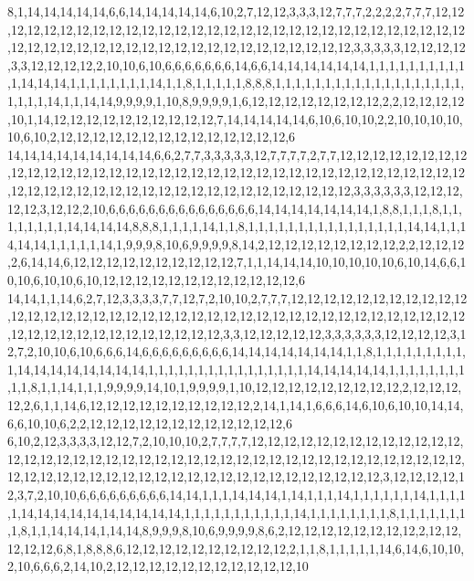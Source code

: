 8,1,14,14,14,14,14,6,6,14,14,14,14,14,6,10,2,7,12,12,3,3,3,12,7,7,7,2,2,2,2,7,7,7,12,12,12,12,12,12,12,12,12,12,12,12,12,12,12,12,12,12,12,12,12,12,12,12,12,12,12,12,12,12,12,12,12,12,12,12,12,12,12,12,12,12,12,12,12,12,12,12,12,12,12,3,3,3,3,3,12,12,12,12,3,3,12,12,12,12,2,10,10,6,10,6,6,6,6,6,6,6,14,6,6,14,14,14,14,14,14,1,1,1,1,1,1,1,1,1,1,1,14,14,14,1,1,1,1,1,1,1,1,14,1,1,8,1,1,1,1,1,8,8,8,1,1,1,1,1,1,1,1,1,1,1,1,1,1,1,1,1,1,1,1,1,1,1,14,1,1,14,14,9,9,9,9,1,10,8,9,9,9,9,1,6,12,12,12,12,12,12,12,12,2,2,12,12,12,12,10,1,14,12,12,12,12,12,12,12,12,12,12,7,14,14,14,14,14,6,10,6,10,10,2,2,10,10,10,10,10,6,10,2,12,12,12,12,12,12,12,12,12,12,12,12,12,12,6
14,14,14,14,14,14,14,14,14,6,6,2,7,7,3,3,3,3,3,12,7,7,7,7,2,7,7,12,12,12,12,12,12,12,12,12,12,12,12,12,12,12,12,12,12,12,12,12,12,12,12,12,12,12,12,12,12,12,12,12,12,12,12,12,12,12,12,12,12,12,12,12,12,12,12,12,12,12,12,12,12,12,12,12,3,3,3,3,3,3,12,12,12,12,12,3,12,12,2,10,6,6,6,6,6,6,6,6,6,6,6,6,6,6,6,14,14,14,14,14,14,14,1,8,8,1,1,1,8,1,1,1,1,1,1,1,1,14,14,14,14,8,8,8,1,1,1,1,14,1,1,8,1,1,1,1,1,1,1,1,1,1,1,1,1,1,1,1,14,14,1,1,14,14,14,1,1,1,1,1,14,1,9,9,9,8,10,6,9,9,9,9,8,14,2,12,12,12,12,12,12,12,12,2,2,12,12,12,2,6,14,14,6,12,12,12,12,12,12,12,12,12,12,7,1,1,14,14,14,10,10,10,10,10,6,10,14,6,6,10,10,6,10,10,6,10,12,12,12,12,12,12,12,12,12,12,12,12,6
14,14,1,1,14,6,2,7,12,3,3,3,3,7,7,12,7,2,10,10,2,7,7,7,12,12,12,12,12,12,12,12,12,12,12,12,12,12,12,12,12,12,12,12,12,12,12,12,12,12,12,12,12,12,12,12,12,12,12,12,12,12,12,12,12,12,12,12,12,12,12,12,12,12,12,12,3,3,12,12,12,12,12,3,3,3,3,3,3,12,12,12,12,3,12,7,2,10,10,6,10,6,6,6,14,6,6,6,6,6,6,6,6,6,14,14,14,14,14,14,14,1,1,8,1,1,1,1,1,1,1,1,1,1,14,14,14,14,14,14,14,14,1,1,1,1,1,1,1,1,1,1,1,1,1,1,1,1,14,14,14,14,14,1,1,1,1,1,1,1,1,1,1,8,1,1,14,1,1,1,9,9,9,9,14,10,1,9,9,9,9,1,10,12,12,12,12,12,12,12,12,12,2,12,12,12,12,2,6,1,1,14,6,12,12,12,12,12,12,12,12,12,12,2,14,1,14,1,6,6,6,14,6,10,6,10,10,14,14,6,6,10,10,6,2,2,12,12,12,12,12,12,12,12,12,12,12,12,6
6,10,2,12,3,3,3,3,12,12,7,2,10,10,10,2,7,7,7,7,12,12,12,12,12,12,12,12,12,12,12,12,12,12,12,12,12,12,12,12,12,12,12,12,12,12,12,12,12,12,12,12,12,12,12,12,12,12,12,12,12,12,12,12,12,12,12,12,12,12,12,12,12,12,12,12,12,12,12,12,12,12,12,12,3,12,12,12,12,12,3,7,2,10,10,6,6,6,6,6,6,6,6,6,14,14,1,1,1,14,14,14,1,14,1,1,1,14,1,1,1,1,1,1,14,1,1,1,1,1,14,14,14,14,14,14,14,14,14,14,1,1,1,1,1,1,1,1,1,1,1,14,1,1,1,1,1,1,1,1,8,1,1,1,1,1,1,1,1,8,1,1,14,14,14,1,14,14,8,9,9,9,8,10,6,9,9,9,9,8,6,2,12,12,12,12,12,12,12,12,2,12,12,12,12,12,6,8,1,8,8,8,6,12,12,12,12,12,12,12,12,12,12,2,1,1,8,1,1,1,1,1,14,6,14,6,10,10,2,10,6,6,6,2,14,10,2,12,12,12,12,12,12,12,12,12,12,12,10
